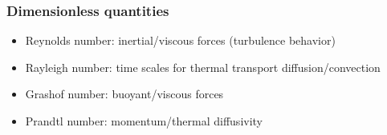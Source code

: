 \begin{frame}
\frametitle{Dimensionless quantities}

\begin{itemize}
\item Reynolds number: inertial/viscous forces (turbulence behavior)
\item Rayleigh number: time scales for thermal transport diffusion/convection
\item Grashof number: buoyant/viscous forces
\item Prandtl number: momentum/thermal diffusivity
\end{itemize}
\end{frame}